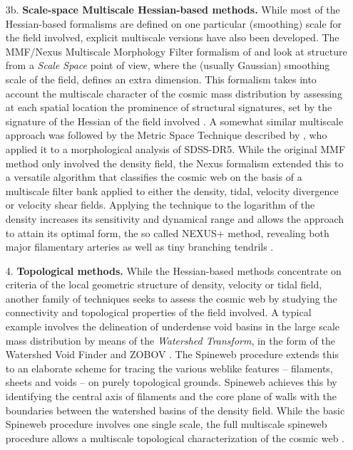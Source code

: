 \documentclass[useAMS,usenatbib]{mnras}
\newcommand{\nexus}{\textsc{NEXUS+}}
\begin{document}
\begin{itemize}
\item[3b.] {\bf Scale-space Multiscale Hessian-based methods.} While most of the Hessian-based formalisms are defined 
on one particular (smoothing) scale for the field involved, explicit multiscale versions have also been developed. 
The MMF/Nexus Multiscale Morphology Filter formalism of \cite{aragon2007} and \cite{cautun2013}  look at structure from a {\it Scale Space} point of view, where the  (usually Gaussian) smoothing scale of the field, defines an extra dimension.
This formalism takes into account the multiscale character of the 
cosmic mass distribution by assessing at each spatial location the prominence of structural signatures, set by the signature of the Hessian of 
the field involved \citep{aragon2007,cautun2013}. A somewhat similar multiscale approach was followed by the Metric Space Technique described 
by \cite{wu2009}, who applied it to a morphological analysis of SDSS-DR5.  While the original MMF method \citep{aragon2007} only 
involved the density field, the Nexus formalism extended this to a versatile algorithm that classifies the cosmic web on the basis 
of a multiscale filter bank applied to  either the density, tidal, velocity divergence or velocity shear fields. Applying the technique to the logarithm of the density increases its sensitivity and dynamical range and allows the approach to attain its optimal form, the so called \nexus{} method, revealing both major filamentary arteries as 
well as tiny branching tendrils \citep{cautun2013}. 

\item[4.] {\bf Topological methods.} While the Hessian-based methods concentrate on criteria of the local geometric structure of density, 
velocity or tidal field, another family of techniques seeks to assess the cosmic web by studying the connectivity and topological 
properties of the field involved. A typical example involves the delineation of underdense void basins in the large scale mass 
distribution by means of the {\it Watershed Transform}, in the form of the Watershed Void Finder \citep{platen2007} and ZOBOV 
\citep{neyrinck2008}. The Spineweb procedure \citep{aragon2010} extends this to an elaborate scheme for tracing the various 
weblike features -- filaments, sheets and voids -- on purely topological grounds. Spineweb achieves this by identifying the 
central axis of filaments and the core plane of walls with the boundaries between the watershed basins of the density field. 
While the basic Spineweb procedure involves one single scale, the full multiscale spineweb procedure allows a multiscale topological 
characterization of the cosmic web \citep{aragon2010b,aragon2013}. 


\end{itemize}
\end{document}
